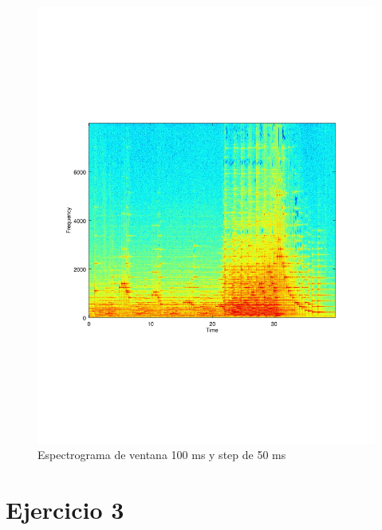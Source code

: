 \documentclass[paper=a4, fontsize=11pt]{scrartcl} %
\numberwithin{equation}{section} %
\numberwithin{figure}{section} %
\numberwithin{table}{section} %
\begin{document}
\begin{figure}[th!]
\includegraphics[width=\textwidth]{../images/specgram_w100s50.pdf}
\caption{Espectrograma de ventana 100 ms y step de 50 ms}
\label{s_100_50}
\end{figure}


\section{Ejercicio 3}
\end{document}
